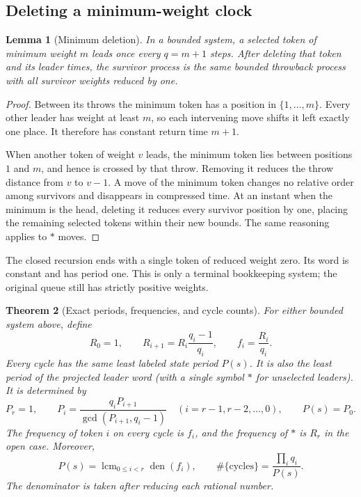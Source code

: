 \documentclass[11pt,letterpaper]{article}
\newtheorem{theorem}{Theorem}[section]
\newtheorem{lemma}[theorem]{Lemma}
\theoremstyle{definition}
\newcommand{\den}{\operatorname{den}}
\newcommand{\lcm}{\operatorname{lcm}}
\begin{document}
\subsection{Deleting a minimum-weight clock}
\begin{lemma}[Minimum deletion]\label{lem:deletion}
In a bounded system, a selected token of minimum weight $m$ leads once every
$q=m+1$ steps. After deleting that token and its leader times, the survivor
process is the same bounded throwback process with all survivor weights
reduced by one.
\end{lemma}
\begin{proof}
Between its throws the minimum token has a position in $\{1,\ldots,m\}$.
Every other leader has weight at least $m$, so each intervening move shifts
it left exactly one place. It therefore has constant return time $m+1$.

When another token of weight $v$ leads, the minimum token lies between
positions $1$ and $m$, and hence is crossed by that throw. Removing it
reduces the throw distance from $v$ to $v-1$. A move of the minimum token
changes no relative order among survivors and disappears in compressed time.
At an instant when the minimum is the head, deleting it reduces every
survivor position by one, placing the remaining selected tokens within their
new bounds. The same reasoning applies to $\ast$ moves.
\end{proof}
The closed recursion ends with a single token of reduced weight zero. Its
word is constant and has period one. This is only a terminal bookkeeping
system; the original queue still has strictly positive weights.

\begin{theorem}[Exact periods, frequencies, and cycle counts]\label{thm:cycles}
For either bounded system above, define
\begin{equation}\label{eq:frequencies}
 R_0=1,\qquad R_{i+1}=R_i\frac{q_i-1}{q_i},\qquad
 f_i=\frac{R_i}{q_i}.
\end{equation}
Every cycle has the same least labeled state period $P(s)$. It is also the
least period of the projected leader word (with a single symbol $\ast$ for
unselected leaders). It is determined by
\begin{equation}\label{eq:period-recurrence}
 P_r=1,\qquad
 P_i=\frac{q_iP_{i+1}}{\gcd(P_{i+1},q_i-1)}
       \quad(i=r-1,r-2,\ldots,0),\qquad P(s)=P_0.
\end{equation}
The frequency of token $i$ on every cycle is $f_i$, and the frequency of
$\ast$ is $R_r$ in the open case. Moreover,
\begin{equation}\label{eq:denominatorperiod}
 P(s)=\lcm_{0\le i<r}\den(f_i),\qquad
 \#\{\text{cycles}\}=\frac{\prod_iq_i}{P(s)}.
\end{equation}
The denominator is taken after reducing each rational number.
\end{theorem}
\end{document}
